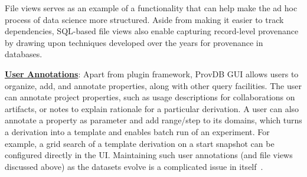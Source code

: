 \documentclass[11pt]{article}
\newcommand{\provdb}{{\sc ProvDB}\xspace}
\newcommand{\eat}[1]{}
\newcommand{\topic}[1]{\vspace{3pt}\noindent\underline{\bf #1}}
\begin{document}
File views serves as an example of a functionality that can help make the ad hoc process of data science more structured. Aside from making it easier to track dependencies, SQL-based file views also enable capturing record-level provenance by drawing upon techniques developed over the years for provenance in databases. 

\topic{User Annotations}: 
Apart from plugin framework, \provdb GUI allows users to organize, add, and
annotate properties, along with other query facilities. The user can annotate
project properties\eat{  is allowed to add provenance information manually},
such as usage descriptions for collaborations on artifacts, or notes to explain
rationale for a particular derivation. A user can also annotate a property as
parameter and add range/step to its domains, which turns a derivation into a
template and enables batch run of an experiment. For example,  a grid search of
a template derivation on a start snapshot\eat{with a start snapshot, a template
derivation, a grid search for an operand,} can be configured directly in the UI.
Maintaining such user annotations (and file views discussed above) as the
datasets evolve is a complicated issue in itself~\cite{katz1990toward}.
\end{document}
